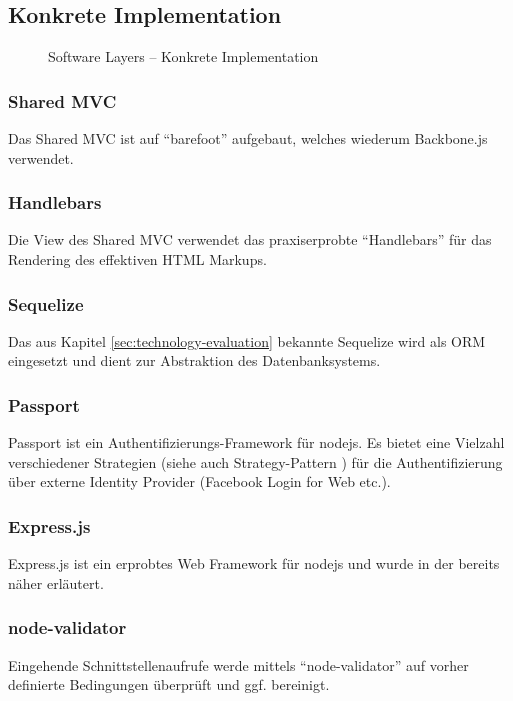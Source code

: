 \subsection*{Konkrete Implementation}

\begin{figure}[H]
	\centering{
		
	}

	\caption{Software Layers -- Konkrete Implementation}
\end{figure}

\subsubsection*{Shared MVC}
Das Shared MVC ist auf ``barefoot'' \cite{Barefoot} aufgebaut, welches wiederum Backbone.js \cite{Backbonejs} verwendet.

\subsubsection*{Handlebars}
Die View des Shared MVC verwendet das praxiserprobte ``Handlebars'' \cite{Handlebars} für das Rendering des effektiven HTML Markups.

\subsubsection*{Sequelize}
Das aus Kapitel \ref{sec:technology-evaluation}  bekannte Sequelize \cite{Sequelize} wird als ORM eingesetzt und dient zur Abstraktion des Datenbanksystems.

\subsubsection*{Passport}
Passport \cite{Passportjs} ist ein Authentifizierungs-Framework für \gls{nodejs}. Es bietet eine Vielzahl verschiedener Strategien (siehe auch Strategy-Pattern \cite{StrategyPattern}) für die Authentifizierung über externe Identity Provider (Facebook Login for Web \cite{facebooklogin} etc.).

\subsubsection*{Express.js}
Express.js \cite{Expressjs} ist ein erprobtes Web Framework für \gls{nodejs} und wurde in der  bereits näher erläutert.

\subsubsection*{node-validator}
Eingehende Schnittstellenaufrufe werde mittels ``node-validator'' \cite{nodevalidator} auf vorher definierte Bedingungen überprüft und ggf. bereinigt.

